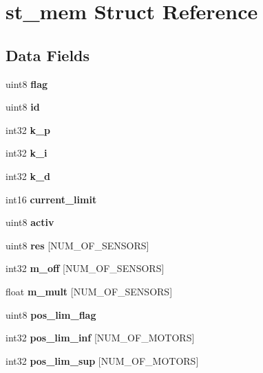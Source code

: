 \section{st\+\_\+mem Struct Reference}
\label{structst__mem}
\subsection*{Data Fields}
\begin{DoxyCompactItemize}
\item 
\mbox{\label{structst__mem_af11e40d15a1361229a78e772af5b3c94}} 
uint8 {\bfseries flag}
\item 
\mbox{\label{structst__mem_a492bfda30c3852a68b2cbfba9531e3d1}} 
uint8 {\bfseries id}
\item 
\mbox{\label{structst__mem_ad1bc394122aa9760c3fc2887a1891cd8}} 
int32 {\bfseries k\+\_\+p}
\item 
\mbox{\label{structst__mem_ad62fb8a39e2de160e14be47e3ff08014}} 
int32 {\bfseries k\+\_\+i}
\item 
\mbox{\label{structst__mem_ab9d15eaa4612dd1c5597e5634cd1d66c}} 
int32 {\bfseries k\+\_\+d}
\item 
\mbox{\label{structst__mem_a96f2aec80e40c1bbe82186a4261ab7ac}} 
int16 {\bfseries current\+\_\+limit}
\item 
\mbox{\label{structst__mem_a63bbebc1db55f43e0571006597a3488b}} 
uint8 {\bfseries activ}
\item 
\mbox{\label{structst__mem_ac2e19d167eac4c8ca9ce97c646e78595}} 
uint8 {\bfseries res} [N\+U\+M\+\_\+\+O\+F\+\_\+\+S\+E\+N\+S\+O\+RS]
\item 
\mbox{\label{structst__mem_ab544f035124be893918bafb611fe88d9}} 
int32 {\bfseries m\+\_\+off} [N\+U\+M\+\_\+\+O\+F\+\_\+\+S\+E\+N\+S\+O\+RS]
\item 
\mbox{\label{structst__mem_aecf0baab567443534c0ded663b746896}} 
float {\bfseries m\+\_\+mult} [N\+U\+M\+\_\+\+O\+F\+\_\+\+S\+E\+N\+S\+O\+RS]
\item 
\mbox{\label{structst__mem_aa2ceebf7546e978c8b0393ce8035532d}} 
uint8 {\bfseries pos\+\_\+lim\+\_\+flag}
\item 
\mbox{\label{structst__mem_a631265c712a620e03d9233634e1819a2}} 
int32 {\bfseries pos\+\_\+lim\+\_\+inf} [N\+U\+M\+\_\+\+O\+F\+\_\+\+M\+O\+T\+O\+RS]
\item 
\mbox{\label{structst__mem_a818808d7c324999701b5aad40a8fabca}} 
int32 {\bfseries pos\+\_\+lim\+\_\+sup} [N\+U\+M\+\_\+\+O\+F\+\_\+\+M\+O\+T\+O\+RS]
\item 

\end{DoxyCompactItemize}

